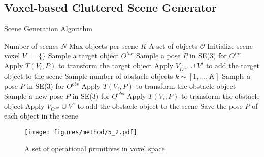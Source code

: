 



\subsection{Voxel-based Cluttered Scene Generator}
\label{UniVoxGen}

\begin{algorithm}
\caption{Scene Generation Algorithm}
\begin{algorithmic}[1]
\REQUIRE Number of scenes $N$
\REQUIRE Max objects per scene $K$
\REQUIRE A set of objects $\mathcal{O}$
    \STATE Initialize scene voxel $V^s = \{\}$
    \STATE Sample a target object $O^{tar}$
    \STATE Sample a pose $P$ in SE(3) for $O^{tar}$
    \STATE Apply $T(V_i, P)$ to transform the target object
    \STATE Apply $V_{O^{tar}} \cup V^s$ to add the target object to the scene
    \STATE Sample number of obstacle objects $k \sim [1, \ldots, K]$
        \STATE Sample a pose $P$ in SE(3) for $O^{obs}$
        \STATE Apply $T(V_i, P)$ to transform the obstacle object
            \STATE Sample a new pose $P$ in SE(3) for $O^{obs}$
            \STATE Apply $T(V_i, P)$ to transform the obstacle object
        \ENDWHILE
        \STATE Apply $V_{O^{obs}} \cup V^s$ to add the obstacle object to the scene
    \ENDFOR
    \STATE Save the pose $P$ of each object in the scene
\ENDFOR
\end{algorithmic}
\label{alg:scene_gen}
\end{algorithm}

\begin{figure}[tb]
    \centering
    \texttt{[image: figures/method/5\_2.pdf]}
    \caption{A set of operational primitives in voxel space.}
    \label{fig:5_2}
\end{figure}

